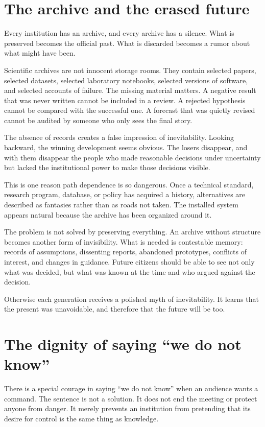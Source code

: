 ﻿\documentclass[12pt,a4paper]{book}
\begin{document}
\section{The archive and the erased future}

Every institution has an archive, and every archive has a silence. What is
preserved becomes the official past. What is discarded becomes a rumor about
what might have been.

Scientific archives are not innocent storage rooms. They contain selected
papers, selected datasets, selected laboratory notebooks, selected versions of
software, and selected accounts of failure. The missing material matters. A
negative result that was never written cannot be included in a review. A
rejected hypothesis cannot be compared with the successful one. A forecast
that was quietly revised cannot be audited by someone who only sees the final
story.

The absence of records creates a false impression of inevitability. Looking
backward, the winning development seems obvious. The losers disappear, and
with them disappear the people who made reasonable decisions under uncertainty
but lacked the institutional power to make those decisions visible.

This is one reason path dependence is so dangerous. Once a technical standard,
research program, database, or policy has acquired a history, alternatives are
described as fantasies rather than as roads not taken. The installed system
appears natural because the archive has been organized around it.

The problem is not solved by preserving everything. An archive without
structure becomes another form of invisibility. What is needed is contestable
memory: records of assumptions, dissenting reports, abandoned prototypes,
conflicts of interest, and changes in guidance. Future citizens should be able
to see not only what was decided, but what was known at the time and who argued
against the decision.

Otherwise each generation receives a polished myth of inevitability. It learns
that the present was unavoidable, and therefore that the future will be too.

\section{The dignity of saying ``we do not know''}

There is a special courage in saying ``we do not know'' when an audience wants
a command. The sentence is not a solution. It does not end the meeting or
protect anyone from danger. It merely prevents an institution from pretending
that its desire for control is the same thing as knowledge.
\end{document}
